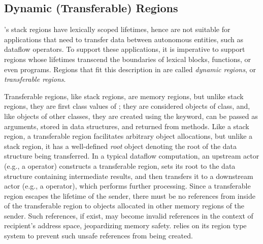 %

\subsection{Dynamic (Transferable) Regions}

\name's stack regions have lexically scoped lifetimes, hence are not
suitable for applications that need to transfer data between
autonomous entities, such as \naiad dataflow operators. To support
these applications, it is imperative to support regions whose
lifetimes transcend the boundaries of lexical blocks, functions, or
even programs. Regions that fit this description in \name are called
\emph{dynamic regions}, or \emph{transferable regions}. 

Transferable regions, like stack regions, are memory regions, but
unlike stack regions, they are first class values of \name; they are
considered objects of  class, and, like objects of other
classes, they are created using the  keyword, can be passed as
arguments, stored in data structures, and returned from methods. Like
a stack region, a transferable region facilitates arbitrary object
allocations, but unlike a stack region, it has a well-defined
\emph{root} object denoting the root of the data structure being
transferred. In a typical dataflow computation, an upstream actor
(e.g., a  operator) constructs a transferable region, sets
its root to the data structure containing intermediate results, and
then transfers it to a downstream actor (e.g., a  operator),
which performs further processing. Since a transferable region escapes
the lifetime of the sender, there must be no references from inside of
the transferable region to objects allocated in other memory regions
of the sender. Such references, if exist, may become invalid
references in the context of recipient's address space, jeopardizing
memory safety. \name relies on its region type system to prevent such
unsafe references from being created.

